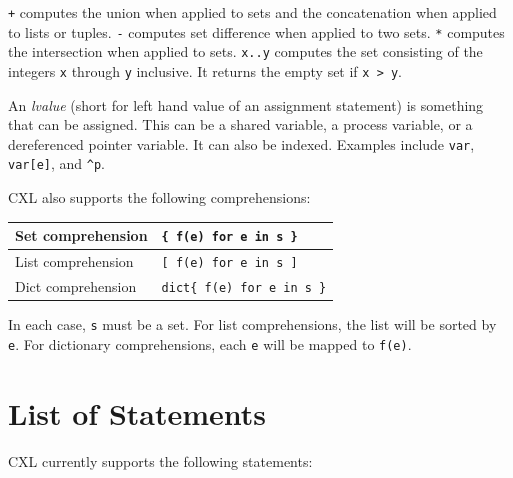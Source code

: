 \documentclass{report}
\begin{document}
\texttt{+} computes the union when applied to sets and
the concatenation when applied to lists or tuples.
\texttt{-} computes set difference when applied to two sets.
\texttt{*} computes the intersection when applied to sets.
\texttt{x..y} computes the set consisting of the integers \texttt{x}
through \texttt{y} inclusive.  It returns the empty set if \texttt{x > y}.

An \emph{lvalue}
(short for left hand value of an assignment statement)
is something that can be assigned.  This can be a
shared variable, a process variable, or a dereferenced pointer
variable.  It can also be indexed.  Examples include
\texttt{var}, \texttt{var[e]}, and \texttt{\^{}p}.

CXL also supports the following comprehensions:

\vspace{1em}
\begin{tabular}{|l|l|}
\hline
Set comprehension & \texttt{\{ f(e) for e in s \}} \\
\hline
List comprehension & \texttt{[ f(e) for e in s ]} \\
\hline
Dict comprehension & \texttt{dict\{ f(e) for e in s \}} \\
\hline
\end{tabular}
\vspace{1em}

In each case, \texttt{s} must be a set.
For list comprehensions, the list will be sorted by \texttt{e}.
For dictionary comprehensions, each \texttt{e} will be mapped to \texttt{f(e)}.

\chapter{List of Statements}

CXL currently supports the following statements:
\end{document}
